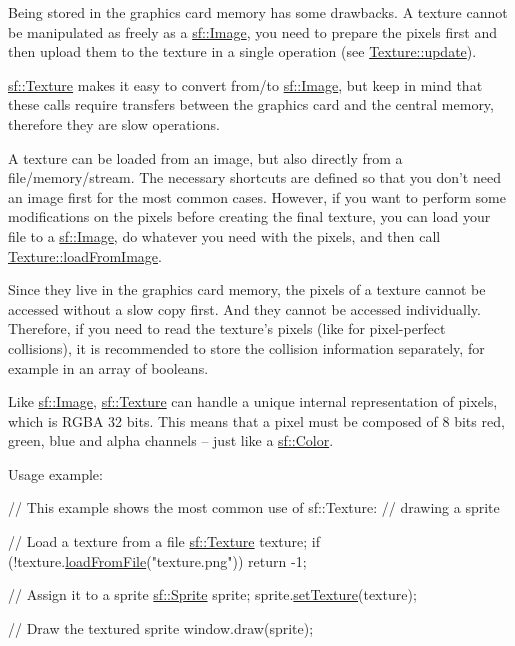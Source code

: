 Being stored in the graphics card memory has some drawbacks. A texture cannot be manipulated as freely as a \hyperlink{classsf_1_1Image}{sf\-::\-Image}, you need to prepare the pixels first and then upload them to the texture in a single operation (see \hyperlink{classsf_1_1Texture_ae4eab5c6781316840b0c50ad08370963}{Texture\-::update}).

\hyperlink{classsf_1_1Texture}{sf\-::\-Texture} makes it easy to convert from/to \hyperlink{classsf_1_1Image}{sf\-::\-Image}, but keep in mind that these calls require transfers between the graphics card and the central memory, therefore they are slow operations.

A texture can be loaded from an image, but also directly from a file/memory/stream. The necessary shortcuts are defined so that you don't need an image first for the most common cases. However, if you want to perform some modifications on the pixels before creating the final texture, you can load your file to a \hyperlink{classsf_1_1Image}{sf\-::\-Image}, do whatever you need with the pixels, and then call \hyperlink{classsf_1_1Texture_abec4567ad9856a3596dc74803f26fba2}{Texture\-::load\-From\-Image}.

Since they live in the graphics card memory, the pixels of a texture cannot be accessed without a slow copy first. And they cannot be accessed individually. Therefore, if you need to read the texture's pixels (like for pixel-\/perfect collisions), it is recommended to store the collision information separately, for example in an array of booleans.

Like \hyperlink{classsf_1_1Image}{sf\-::\-Image}, \hyperlink{classsf_1_1Texture}{sf\-::\-Texture} can handle a unique internal representation of pixels, which is R\-G\-B\-A 32 bits. This means that a pixel must be composed of 8 bits red, green, blue and alpha channels -- just like a \hyperlink{classsf_1_1Color}{sf\-::\-Color}.

Usage example\-: 
\begin{DoxyCode}
\textcolor{comment}{// This example shows the most common use of sf::Texture:}
\textcolor{comment}{// drawing a sprite}

\textcolor{comment}{// Load a texture from a file}
\hyperlink{classsf_1_1Texture}{sf::Texture} texture;
\textcolor{keywordflow}{if} (!texture.\hyperlink{classsf_1_1Texture_a8e1b56eabfe33e2e0e1cb03712c7fcc7}{loadFromFile}(\textcolor{stringliteral}{"texture.png"}))
    \textcolor{keywordflow}{return} -1;

\textcolor{comment}{// Assign it to a sprite}
\hyperlink{classsf_1_1Sprite}{sf::Sprite} sprite;
sprite.\hyperlink{classsf_1_1Sprite_a3729c88d88ac38c19317c18e87242560}{setTexture}(texture);

\textcolor{comment}{// Draw the textured sprite}
window.draw(sprite);
\end{DoxyCode}



